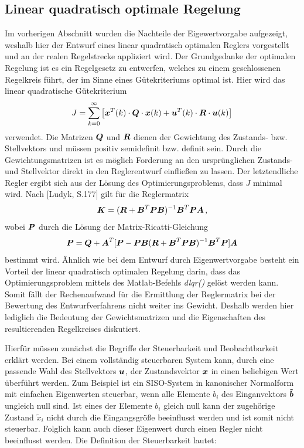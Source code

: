 \subsection{Linear quadratisch optimale Regelung}
Im vorherigen Abschnitt wurden die Nachteile der Eigewertvorgabe aufgezeigt, weshalb hier der Entwurf eines linear quadratisch optimalen Reglers vorgestellt und an der realen Regelstrecke appliziert wird. Der Grundgedanke der optimalen Regelung ist es ein Regelgesetz zu entwerfen, welches zu einem geschlossenen Regelkreis führt, der im Sinne eines Gütekriteriums optimal ist. Hier wird das linear quadratische Gütekriterium
\begin{equation}
J = \sum^{\infty}_{k=0} \left[\boldsymbol{x}^T(k)\cdot \boldsymbol{Q} \cdot \boldsymbol{x}(k) + \boldsymbol{u}^T(k)\cdot \boldsymbol{R}\cdot \boldsymbol{u}(k)\right]
\end{equation}
verwendet. Die Matrizen $\boldsymbol{Q}$ und $\boldsymbol{R}$ dienen der Gewichtung des Zustands- bzw. Stellvektors und müssen positiv semidefinit bzw. definit sein. Durch die Gewichtungsmatrizen ist es möglich Forderung an den ursprünglichen Zustands- und Stellvektor direkt in den Reglerentwurf einfließen zu lassen. Der letztendliche Regler ergibt sich aus der Lösung des Optimierungsproblems, dass $J$ minimal wird. Nach [Ludyk, S.177] gilt für die Reglermatrix
\begin{equation}
\boldsymbol{K} = (\boldsymbol{R}+\boldsymbol{B}^T\boldsymbol{P}\boldsymbol{B})^{-1}\boldsymbol{B}^T\boldsymbol{P}\boldsymbol{A}\,,
\end{equation}
wobei $\boldsymbol{P}$ durch die Lösung der Matrix-Ricatti-Gleichung 
\begin{equation}
\boldsymbol{P} = \boldsymbol{Q}+\boldsymbol{A}^T[\boldsymbol{P}-\boldsymbol{P}\boldsymbol{B}(\boldsymbol{R}+\boldsymbol{B}^T\boldsymbol{P}\boldsymbol{B})^{-1}\boldsymbol{B}^T\boldsymbol{P}]\boldsymbol{A}
\end{equation}
bestimmt wird. Ähnlich wie bei dem Entwurf durch Eigenwertvorgabe besteht ein Vorteil der linear quadratisch optimalen Regelung darin, dass das Optimierungsproblem mittels des Matlab-Befehls \textit{dlqr()} gelöst werden kann. Somit fällt der Rechenaufwand für die Ermittlung der Reglermatrix bei der Bewertung des Entwurfverfahrens nicht weiter ins Gewicht. Deshalb werden hier lediglich die Bedeutung der Gewichtsmatrizen und die Eigenschaften des resultierenden Regelkreises diskutiert.

Hierfür müssen zunächst die Begriffe der Steuerbarkeit und Beobachtbarkeit erklärt werden. Bei einem vollständig steuerbaren System kann, durch eine passende Wahl des Stellvektors $\boldsymbol{u}$, der Zustandsvektor $\boldsymbol{x}$ in einen beliebigen Wert überführt werden. Zum Beispiel ist ein SISO-System in kanonischer Normalform mit einfachen Eigenwerten steuerbar, wenn alle Elemente $b_{i}$ des Einganvektors $\boldsymbol{\tilde{b}}$ ungleich null sind. Ist eines der Elemente $b_{i}$ gleich null kann der zugehörige Zustand $\tilde{x}_i$ nicht durch die Eingangsgröße beeinflusst werden und ist somit nicht steuerbar. Folglich kann auch dieser Eigenwert durch einen Regler nicht beeinflusst werden. Die Definition der Steuerbarkeit lautet:

